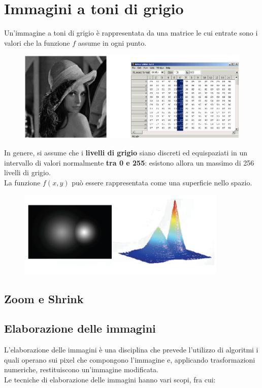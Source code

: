 \section{Immagini a toni di grigio}

Un'immagine a toni di grigio è rappresentata da una matrice le cui
entrate sono i valori che la funzione $f$ assume in ogni punto.

\begin{figure}[H]
    \centering
    \includegraphics[width=12cm, keepaspectratio]{capitoli/immagini/imgs/rappresentazione_immagine_toni_grigio.jpg}
\end{figure}

In genere, si assume che i \textbf{livelli di grigio} siano discreti ed
equispaziati in un intervallo di valori normalmente \textbf{tra 0 e 255}:
esistono allora un massimo di 256 livelli di grigio.
\\
La funzione $f (x , y)$ può essere rappresentata come una superficie
nello spazio.

\begin{figure}[H]
    \centering
    \includegraphics[width=10cm, keepaspectratio]{capitoli/immagini/imgs/funzione_toni_grigio.jpg}
\end{figure}

\subsection{Zoom e Shrink}


\subsection{Elaborazione delle immagini}
L'elaborazione delle immagini è una disciplina che prevede l'utilizzo
di algoritmi i quali operano sui pixel che compongono l'immagine
e, applicando trasformazioni numeriche, restituiscono un'immagine
modificata.\\
Le tecniche di elaborazione delle immagini hanno vari scopi, fra cui:

